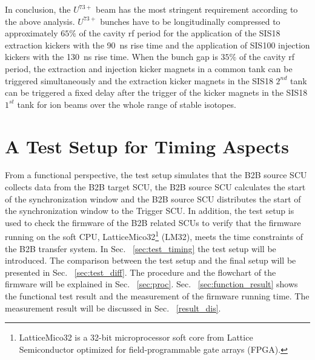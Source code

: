 In conclusion, the $U^\mathit{73+}$ beam has the most stringent requirement according to the above analysis. $U^\mathit{73+}$ bunches have to be longitudinally compressed to approximately $65\%$ of the cavity rf period for the application of the SIS18 extraction kickers with the \SI{90}{ns} rise time and the application of SIS100 injection kickers with the \SI{130}{ns} rise time. When the bunch gap is $35\%$ of the cavity rf period, the extraction and injection kicker magnets in a common tank can be triggered simultaneously and the extraction kicker magnets in the SIS18 $2^{nd}$ tank can be triggered a fixed delay after the trigger of the kicker magnets in the SIS18  $1^{st}$ tank for ion beams over the whole range of stable isotopes.
\section{A Test Setup for Timing Aspects}
\label{real_test}

From a functional perspective, the test setup simulates that the B2B source SCU collects data from the B2B target SCU, the B2B source SCU calculates the start of the synchronization window and the B2B source SCU distributes the start of the synchronization window to the Trigger SCU. In addition, the test setup is used to check the firmware of the B2B related SCUs to verify that the firmware running on the soft CPU, LatticeMico32\footnote{LatticeMico32 is a 32-bit microprocessor soft core from Lattice Semiconductor optimized for field-programmable gate arrays (\gls{FPGA}).} (\gls{LM32}), meets the time constraints of the B2B transfer system.  In Sec. ~\ref{sec:test_timing} the test setup will be introduced. The comparison between the test setup and the final setup will be presented in Sec. ~\ref{sec:test_diff}. The procedure and the flowchart of the firmware will be explained in Sec. ~\ref{sec:proc}. Sec. ~\ref{sec:function_result} shows the functional test result and the measurement of the firmware running time. The measurement result will be discussed in Sec. ~\ref{result_dis}.  


